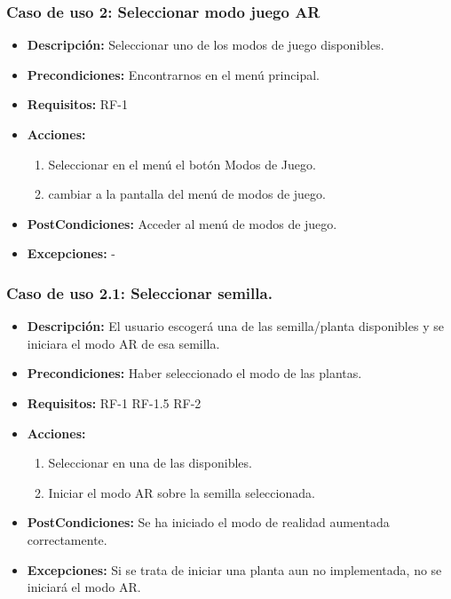 \subsubsection{Caso de uso 2:  Seleccionar modo juego AR}
 \begin{itemize}
 	\item \textbf{Descripción:} Seleccionar uno de los modos de juego disponibles.
 	\item \textbf{Precondiciones:} Encontrarnos en el menú principal.
 	\item \textbf{Requisitos:} RF-1
 	\item \textbf{Acciones:}
 	\begin{enumerate}
 		\item Seleccionar en el menú el botón Modos de Juego.
 		\item cambiar a la pantalla del menú de modos de juego.
 	\end{enumerate}
 	\item \textbf{PostCondiciones:} Acceder al menú de modos de juego.
 	\item \textbf{Excepciones:}	-
 \end{itemize}
\subsubsection{Caso de uso 2.1: Seleccionar semilla.}
\begin{itemize}
	\item \textbf{Descripción:} El usuario escogerá una de las semilla/planta disponibles y se iniciara el modo AR de esa semilla.
	\item \textbf{Precondiciones:} Haber seleccionado el modo de las plantas.
	\item \textbf{Requisitos:} RF-1 RF-1.5 RF-2
	\item \textbf{Acciones:}
	\begin{enumerate}
		\item Seleccionar en una de las disponibles.
		\item Iniciar el modo AR sobre la semilla seleccionada.
	\end{enumerate}
	\item \textbf{PostCondiciones:} Se ha iniciado el modo de realidad aumentada correctamente.
	\item \textbf{Excepciones:} Si se trata de iniciar una planta aun no implementada, no se iniciará el modo AR.
\end{itemize}

